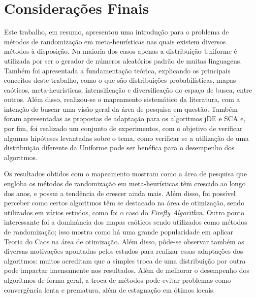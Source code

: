 \chapter{Considerações Finais}




Este trabalho, em resumo, apresentou uma introdução para o problema de métodos de randomização em meta-heurísticas nas quais existem diversos métodos à disposição. Na maioria dos casos apenas a distribuição Uniforme é utilizada por ser o gerador de números aleatórios padrão de muitas linguagens. Também foi apresentada a fundamentação teórica, explicando os principais conceitos deste trabalho, como o que são distribuições probabilísticas, mapas caóticos, meta-heurísticas, intensificação e diversificação do espaço de busca, entre outros. Além disso, realizou-se o mapeamento sistemático da literatura, com a intenção de buscar uma visão geral da área de pesquisa em questão. Também foram apresentadas as propostas de adaptação para os algoritmos jDE e SCA e, por fim, foi realizado um conjunto de experimentos, com o objetivo de verificar algumas hipóteses levantadas sobre o tema, como verificar se a utilização de uma distribuição diferente da Uniforme pode ser benéfica para o desempenho dos algoritmos.

Os resultados obtidos com o mapeamento mostram como a área de pesquisa que engloba os métodos de randomização em meta-heurísticas têm crescido ao longo dos anos, e possui a tendência de crescer ainda mais. Além disso, foi possível perceber como certos algoritmos têm se destacado na área de otimização, sendo utilizados em vários estudos, como foi o caso do \textit{Firefly Algorithm}. Outro ponto interessante foi a dominância dos mapas caóticos sendo utilizados como métodos de randomização; isso mostra como há uma grande popularidade em aplicar Teoria do Caos na área de otimização. Além disso, pôde-se observar também as diversas motivações apontadas pelos estudos para realizar essas adaptações dos algoritmos: muitos acreditam que a simples troca de uma distribuição por outra pode impactar imensamente nos resultados. Além de melhorar o desempenho dos algoritmos de forma geral, a troca de métodos pode evitar problemas como convergência lenta e prematura, além de estagnação em ótimos locais.

